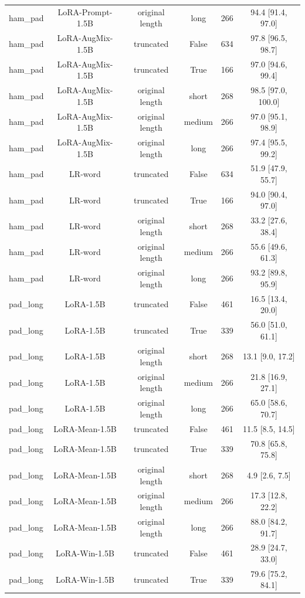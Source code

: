 \begin{table}[t]
\begin{tabular}{lccccc}
ham\_pad & LoRA-Prompt-1.5B & original length & long & 266 & 94.4 [91.4, 97.0] \\
ham\_pad & LoRA-AugMix-1.5B & truncated & False & 634 & 97.8 [96.5, 98.7] \\
ham\_pad & LoRA-AugMix-1.5B & truncated & True & 166 & 97.0 [94.6, 99.4] \\
ham\_pad & LoRA-AugMix-1.5B & original length & short & 268 & 98.5 [97.0, 100.0] \\
ham\_pad & LoRA-AugMix-1.5B & original length & medium & 266 & 97.0 [95.1, 98.9] \\
ham\_pad & LoRA-AugMix-1.5B & original length & long & 266 & 97.4 [95.5, 99.2] \\
ham\_pad & LR-word & truncated & False & 634 & 51.9 [47.9, 55.7] \\
ham\_pad & LR-word & truncated & True & 166 & 94.0 [90.4, 97.0] \\
ham\_pad & LR-word & original length & short & 268 & 33.2 [27.6, 38.4] \\
ham\_pad & LR-word & original length & medium & 266 & 55.6 [49.6, 61.3] \\
ham\_pad & LR-word & original length & long & 266 & 93.2 [89.8, 95.9] \\
pad\_long & LoRA-1.5B & truncated & False & 461 & 16.5 [13.4, 20.0] \\
pad\_long & LoRA-1.5B & truncated & True & 339 & 56.0 [51.0, 61.1] \\
pad\_long & LoRA-1.5B & original length & short & 268 & 13.1 [9.0, 17.2] \\
pad\_long & LoRA-1.5B & original length & medium & 266 & 21.8 [16.9, 27.1] \\
pad\_long & LoRA-1.5B & original length & long & 266 & 65.0 [58.6, 70.7] \\
pad\_long & LoRA-Mean-1.5B & truncated & False & 461 & 11.5 [8.5, 14.5] \\
pad\_long & LoRA-Mean-1.5B & truncated & True & 339 & 70.8 [65.8, 75.8] \\
pad\_long & LoRA-Mean-1.5B & original length & short & 268 & 4.9 [2.6, 7.5] \\
pad\_long & LoRA-Mean-1.5B & original length & medium & 266 & 17.3 [12.8, 22.2] \\
pad\_long & LoRA-Mean-1.5B & original length & long & 266 & 88.0 [84.2, 91.7] \\
pad\_long & LoRA-Win-1.5B & truncated & False & 461 & 28.9 [24.7, 33.0] \\
pad\_long & LoRA-Win-1.5B & truncated & True & 339 & 79.6 [75.2, 84.1] \\

\end{tabular}
\end{table}
